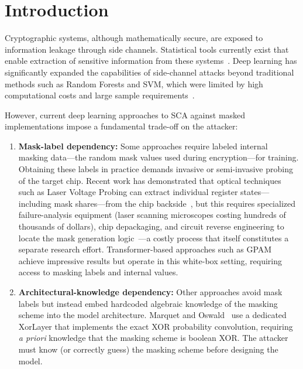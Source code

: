 \documentclass[runningheads]{llncs}
\begin{document}
\section{Introduction}\label{sec:introduction}

Cryptographic systems, although mathematically secure, are exposed to information leakage through side channels.
Statistical tools currently exist that enable extraction of sensitive information from these systems~\cite{kocher1999differential,brier2004correlation,mangard2007power}.
Deep learning has significantly expanded the capabilities of side-channel attacks beyond traditional methods such as Random Forests and SVM, which were limited by high computational costs and large sample requirements~\cite{maghrebi2016breaking,marquet2024exploring}.

However, current deep learning approaches to SCA against masked implementations impose a fundamental trade-off on the attacker:

\begin{enumerate}[leftmargin=*]
  \item \textbf{Mask-label dependency:}
  Some approaches require labeled internal masking data---the random mask values used during encryption---for training.
  Obtaining these labels in practice demands invasive or semi-invasive probing of the target chip.
  Recent work has demonstrated that optical techniques such as Laser Voltage Probing can extract individual register states---including mask shares---from the chip backside~\cite{krachenfels2021snapshots,krachenfels2021automatic}, but this requires specialized failure-analysis equipment (laser scanning microscopes costing hundreds of thousands of dollars), chip depackaging, and circuit reverse engineering to locate the mask generation logic~\cite{lohrke2016noplacetohi,khalajmonfared2024laserescape}---a costly process that itself constitutes a separate research effort.
  Transformer-based approaches such as GPAM~\cite{bursztein2024gpam} achieve impressive results but operate in this white-box setting, requiring access to masking labels and internal values.

  \item \textbf{Architectural-knowledge dependency:}
  Other approaches avoid mask labels but instead embed hardcoded algebraic knowledge of the masking scheme into the model architecture.
  Marquet and Oswald~\cite{marquet2024exploring} use a dedicated XorLayer that implements the exact XOR probability convolution, requiring \emph{a priori} knowledge that the masking scheme is boolean XOR.
  The attacker must know (or correctly guess) the masking scheme before designing the model.
\end{enumerate}
\end{document}
